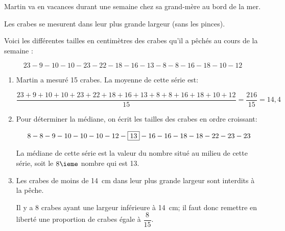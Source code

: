 
\medskip

Martin va en vacances durant une semaine chez sa grand-mère
au bord de la mer.

Les crabes se mesurent dans leur plus grande largeur (sans les pinces).

Voici les différentes tailles en centimètres des crabes qu'il a
pêchés au cours de la semaine :

\[23 - 9 - 10 - 10 - 23 - 22 - 18 - 16 - 13 - 8 - 8 - 16 - 18 - 10 - 12\]

\begin{enumerate}
\item%
Martin a mesuré 15 crabes. La moyenne de cette série est:

$\dfrac{23 + 9 + 10 + 10 + 23 + 22 + 18 + 16 + 13 + 8 + 8 + 16 + 18 + 10 + 12}{15} = \dfrac{216}{15}=14,4 $

\item%
Pour déterminer la médiane, on écrit les tailles des crabes en ordre croissant:

\[ 8 - 8 - 9 - 10 - 10 - 10 - 12 - \fbox{13} - 16 - 16 - 18 - 18 - 22 - 23 - 23\]

La médiane de cette série est la valeur du nombre situé \og{} au milieu\fg{} de cette série, soit le $8\ieme$ nombre qui est 13.

\item Les crabes de moins de 14~cm dans leur plus grande largeur sont interdits à la pêche. 


Il y a 8 crabes ayant une largeur inférieure à 14~cm; il faut donc remettre en liberté une proportion de crabes égale à $\dfrac{8}{15}$.

\end{enumerate}

\vspace{0,5cm}

